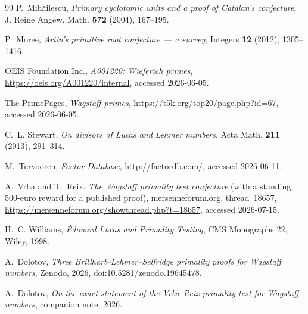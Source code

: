 \documentclass[11pt]{amsart}
\theoremstyle{plain}
\theoremstyle{definition}
\theoremstyle{remark}
\numberwithin{equation}{section}
\begin{document}
\begin{thebibliography}{99}
 P.~Mih{\u a}ilescu, \emph{Primary cyclotomic units and a proof of Catalan's conjecture}, J. Reine Angew. Math. \textbf{572} (2004), 167--195.

 P.~Moree, \emph{Artin's primitive root conjecture --- a survey}, Integers \textbf{12} (2012), 1305--1416.

 OEIS Foundation Inc., \emph{A001220: Wieferich primes}, \url{https://oeis.org/A001220/internal}, accessed 2026-06-05.

 The PrimePages, \emph{Wagstaff primes}, \url{https://t5k.org/top20/page.php?id=67}, accessed 2026-06-05.

 C.~L. Stewart, \emph{On divisors of Lucas and Lehmer numbers}, Acta Math. \textbf{211} (2013), 291--314.

 M.~Tervooren, \emph{Factor Database}, \url{http://factordb.com/}, accessed 2026-06-11.

 A.~Vrba and T.~Reix, \emph{The Wagstaff primality test conjecture} (with a standing 500-euro reward for a published proof), mersenneforum.org, thread~18657, \url{https://mersenneforum.org/showthread.php?t=18657}, accessed 2026-07-15.

 H.~C. Williams, \emph{\'Edouard Lucas and Primality Testing}, CMS Monographs 22, Wiley, 1998.

 A.~Dolotov, \emph{Three Brillhart--Lehmer--Selfridge primality proofs for Wagstaff numbers}, Zenodo, 2026, doi:10.5281/zenodo.19645478.

 A.~Dolotov, \emph{On the exact statement of the Vrba--Reix primality test for Wagstaff numbers}, companion note, 2026.

\end{thebibliography}
\end{document}
